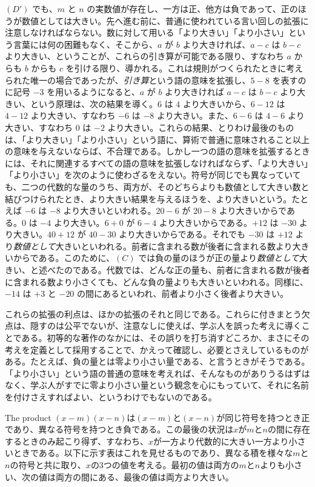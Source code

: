 \documentclass[a4paper,11pt,openany]{ltjsbook}
\newcommand{\Eq}[1]{\ensuremath{#1}}
\begin{document}
\Eq{(D')} でも、$m$ と $n$ の実数値が存在し、一方は正、他方は負であって、正のほうが数値としては大きい。先へ進む前に、普通に使われている言い回しの拡張に注意しなければならない。数に対して用いる「より大きい」「より小さい」という言葉には何の困難もなく、そこから、$a$ が $b$ より大きければ、$a - c$ は $b - c$ より大きい、ということが、これらの引き算が可能である限り、すなわち $a$ からも $b$ からも $c$ を引ける限り、導かれる。これは規則がつくられたときに考えられた唯一の場合であったが、\emph{引き算}という語の意味を拡張し、$5 - 8$ を表すのに記号 $-3$ を用いるようになると、$a$ が $b$ より大きければ $a - c$ は $b - c$ より大きい、という原理は、次の結果を導く。$6$ は $4$ より大きいから、$6 - 12$ は $4 - 12$ より大きい、すなわち $-6$ は $-8$ より大きい。また、$6 - 6$ は $4 - 6$ より大きい、すなわち $0$ は $-2$ より大きい。これらの結果、とりわけ最後のものは、「より大きい」「より小さい」という語に、算術で普通に意味されること以上の意味を与えないならば、不合理である。しかし一つの語の意味を拡張するときには、それに関連するすべての語の意味を拡張しなければならず、「より大きい」「より小さい」を次のように使わざるをえない。符号が同じでも異なっていても、二つの代数的な量のうち、両方が、そのどちらよりも数値として大きい数と結びつけられたとき、より大きい結果を与えるほうを、より大きいという。たとえば $-6$ は $-8$ より大きいといわれる。$20 - 6$ が $20 - 8$ より大きいからである。$0$ は $-4$ より大きい。$6 + 0$ が $6 - 4$ より大きいからである。$+12$ は $-30$ より大きい。$40 + 12$ が $40 - 30$ より大きいからである。それでも $-30$ は $+12$ より\emph{数値として}大きいといわれる。前者に含まれる数が後者に含まれる数より大きいからである。このために、\Eq{(C)} では負の量のほうが正の量より\emph{数値として}大きい、と述べたのである。代数では、どんな正の量も、前者に含まれる数が後者に含まれる数より小さくても、どんな負の量よりも大きいといわれる。同様に、$-14$ は $+3$ と $-20$ の間にあるといわれ、前者より小さく後者より大きい。

これらの拡張の利点は、ほかの拡張のそれと同じである。これらに付きまとう欠点は、隠すのは公平でないが、注意なしに使えば、学ぶ人を誤った考えに導くことである。初等的な著作のなかには、その誤りを打ち消すどころか、まさにその考えを定義として採用することで、かえって確認し、必要とさえしているものがある。たとえば、負の量とは零より小さい量である、と言うときがそうである。「より小さい」という語の普通の意味を考えれば、そんなものがありうるはずはなく、学ぶ人がすでに零より小さい量という観念を心にもっていて、それに名前を付けさえすればよい、というわけでもないのである。

The product $(x - m)(x - n)$は$(x - m)$と$(x - n)$が同じ符号を持つとき正であり、異なる符号を持つとき負である。この最後の状況は$x$が$m$と$n$の間に存在するときのみ起こり得ず、すなわち、$x$が一方より代数的に大きい一方より小さいときである。以下に示す表はこれを見せるものであり、異なる積を様々な$m$と$n$の符号と共に取り、$x$の3つの値を考える。最初の値は両方の$m$と$n$よりも小さい、次の値は両方の間にある、最後の値は両方より大きい。
\end{document}
